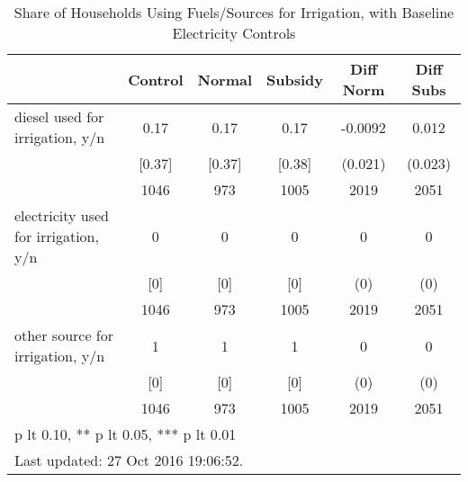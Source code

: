 \begin{table}[htbp]\centering
\def\sym#1{\ifmmode^{#1}\else\(^{#1}\)\fi}
\caption{Share of Households Using Fuels/Sources for Irrigation, with Baseline Electricity Controls \label{tab:"balance"}}
\begin{tabular*}{0.9\hsize}{@{\hskip\tabcolsep\extracolsep\fill}l*{1}{ccccc}}
\toprule
                                &  Control&   Normal&  Subsidy&Diff Norm         &Diff Subs         \\
\midrule
diesel used for irrigation, y/n &     0.17&     0.17&     0.17&  -0.0092         &    0.012         \\
                                &   [0.37]&   [0.37]&   [0.38]&  (0.021)         &  (0.023)         \\
                                &     1046&      973&     1005&     2019         &     2051         \\
electricity used for irrigation, y/n&        0&        0&        0&        0         &        0         \\
                                &      [0]&      [0]&      [0]&      (0)         &      (0)         \\
                                &     1046&      973&     1005&     2019         &     2051         \\
other source for irrigation, y/n&        1&        1&        1&        0         &        0         \\
                                &      [0]&      [0]&      [0]&      (0)         &      (0)         \\
                                &     1046&      973&     1005&     2019         &     2051         \\
\bottomrule
\multicolumn{6}{l}{\footnotesize * p lt 0.10, ** p lt 0.05, *** p lt 0.01}\\
\multicolumn{6}{l}{\footnotesize Last updated: 27 Oct 2016 19:06:52.}\\
\end{tabular*}
\end{table}
